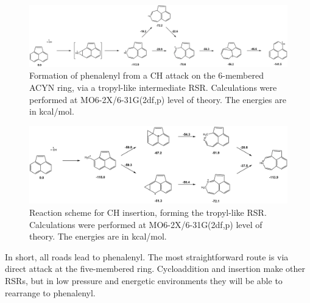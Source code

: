 \documentclass[journal=jacsat,manuscript=article,layout=onecolumn]{achemso}
\begin{document}
\begin{figure}[h!]
	\includegraphics[width=1\textwidth]{Figures/Figure6}
	\caption{Formation of phenalenyl from a CH attack on the 6-membered ACYN ring, via a tropyl-like intermediate RSR. Calculations were performed at MO6-2X/6-31G(2df,p) level of theory. The energies are in kcal/mol.}
	\label{fig6}
\end{figure}

\begin{figure}[h!]
	\includegraphics[width=1\textwidth]{Figures/Figure7}
	\caption{Reaction scheme for CH insertion, forming the tropyl-like RSR. Calculations were performed at MO6-2X/6-31G(2df,p) level of theory. The energies are in kcal/mol.}
	\label{fig7}
\end{figure}



In short, all roads lead to phenalenyl. The most straightforward route is via direct attack at the five-membered ring. Cycloaddition and insertion make other RSRs, but in low pressure and energetic environments they will be able to rearrange to phenalenyl. %
\end{document}
